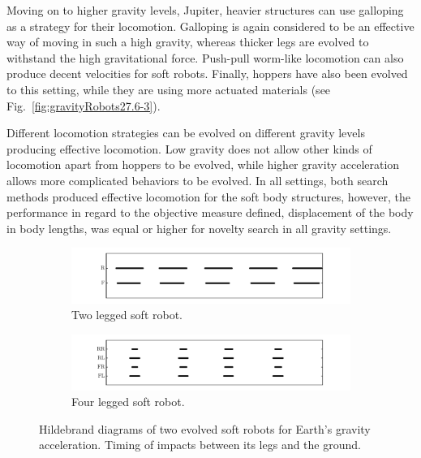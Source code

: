\documentclass{sig-alternate}
\begin{document}
Moving on to higher gravity levels, Jupiter, heavier structures can use galloping as a strategy for their locomotion. Galloping is again considered to be an effective way of moving in such a high gravity, whereas thicker legs are evolved to withstand the high gravitational force. Push-pull worm-like locomotion can also produce decent velocities for soft robots. Finally, hoppers have also been evolved to this setting, while they are using more actuated materials (see Fig.~\ref{fig:gravityRobots27.6-3}).


Different locomotion strategies can be evolved on different gravity levels producing effective locomotion. Low gravity does not allow other kinds of locomotion apart from hoppers to be evolved, while higher gravity acceleration allows more complicated behaviors to be evolved. In all settings, both search methods produced effective locomotion for the soft body structures, however, the performance in regard to the objective measure defined, displacement of the body in body lengths, was equal or higher for novelty search in all gravity settings.

\begin{figure}[t!]
\centering
\begin{subfigure}[b]{0.5\textwidth}
\centering
\includegraphics[width=1.0\textwidth]{../Figures/Results/hildebrand1.pdf}
\caption{Two legged soft robot.}
\end{subfigure}
\vspace{-0.2cm}
\begin{subfigure}[b]{0.5\textwidth}
\centering
\includegraphics[width=1.0\textwidth]{../Figures/Results/hildebrand2.pdf}
\caption{Four legged soft robot.}
\end{subfigure}
\vspace{-0.2cm}
\caption{Hildebrand diagrams of two evolved soft robots for Earth's gravity acceleration. Timing of impacts between its legs and the ground.}
\label{fig:hildebrand}
\vspace{-15pt}
\end{figure}
\end{document}
